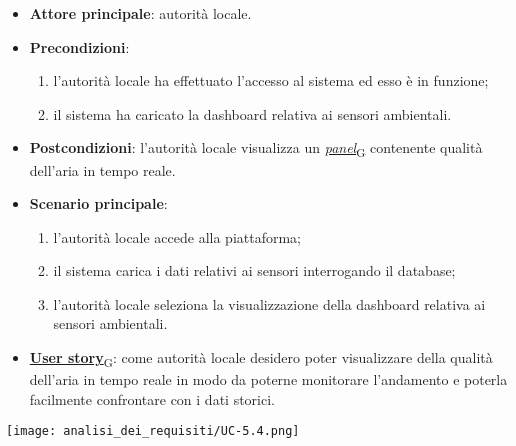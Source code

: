 \begin{itemize}
	\item \textbf{Attore principale}: autorità locale.
	\item \textbf{Precondizioni}:
	      \begin{enumerate}
		      \item l'autorità locale ha effettuato l'accesso al sistema ed esso è in funzione;
		      \item il sistema ha caricato la dashboard relativa ai sensori ambientali.
	      \end{enumerate}
	\item \textbf{Postcondizioni}: l'autorità locale visualizza un \href{https://7last.github.io/docs/rtb/documentazione-interna/glossario\#panel}{\textit{panel}\textsubscript{G}} contenente qualità dell'aria in tempo reale.
	\item \textbf{Scenario principale}:
	      \begin{enumerate}
		      \item l'autorità locale accede alla piattaforma;
		      \item il sistema carica i dati relativi ai sensori interrogando il database;
		      \item l'autorità locale seleziona la visualizzazione della dashboard relativa ai sensori ambientali.
	      \end{enumerate}
	\item \href{https://7last.github.io/docs/rtb/documentazione-interna/glossario\#user-story}{\textbf{User story}\textsubscript{G}}:
	      come autorità locale desidero poter visualizzare della qualità dell'aria in tempo reale in modo da poterne monitorare l'andamento
	      e poterla facilmente confrontare con i dati storici.
\end{itemize}
\begin{center}
	\texttt{[image: analisi\_dei\_requisiti/UC-5.4.png]}
\end{center}

